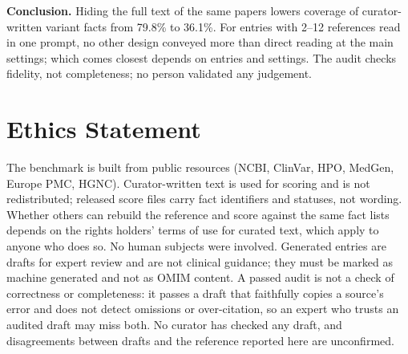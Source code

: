 \documentclass{article} %
\begin{document}
\textbf{Conclusion.} Hiding the full text of the same papers lowers coverage of curator-written variant facts from 79.8\% to 36.1\%. For entries with 2--12 references read in one prompt, no other design conveyed more than direct reading at the main settings; which comes closest depends on entries and settings. The audit checks fidelity, not completeness; no person validated any judgement.

\section*{Ethics Statement}
The benchmark is built from public resources (NCBI, ClinVar, HPO, MedGen, Europe PMC, HGNC). Curator-written text is used for scoring and is not redistributed; released score files carry fact identifiers and statuses, not wording. Whether others can rebuild the reference and score against the same fact lists depends on the rights holders' terms of use for curated text, which apply to anyone who does so. No human subjects were involved. Generated entries are drafts for expert review and are not clinical guidance; they must be marked as machine generated and not as OMIM content. A passed audit is not a check of correctness or completeness: it passes a draft that faithfully copies a source's error and does not detect omissions or over-citation, so an expert who trusts an audited draft may miss both. No curator has checked any draft, and disagreements between drafts and the reference reported here are unconfirmed.
\end{document}
